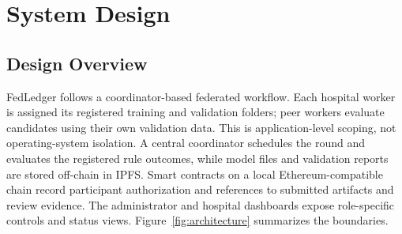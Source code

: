 \documentclass[12pt,a4paper]{report}
\begin{document}
\doublespacing
\chapter{System Design}
\section{Design Overview}
FedLedger follows a coordinator-based federated workflow. Each hospital worker is assigned its registered training and validation folders; peer workers evaluate candidates using their own validation data. This is application-level scoping, not operating-system isolation. A central coordinator schedules the round and evaluates the registered rule outcomes, while model files and validation reports are stored off-chain in IPFS. Smart contracts on a local Ethereum-compatible chain record participant authorization and references to submitted artifacts and review evidence. The administrator and hospital dashboards expose role-specific controls and status views. Figure~\ref{fig:architecture} summarizes the boundaries.
\end{document}
